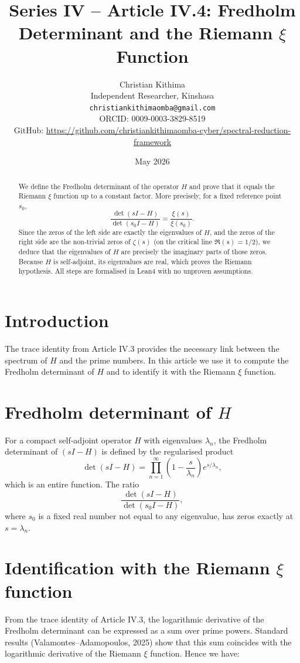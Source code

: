 \documentclass[11pt,a4paper]{article}
\title{Series IV – Article IV.4: Fredholm Determinant and the Riemann $\xi$ Function}
\author{Christian Kithima \\
Independent Researcher, Kinshasa \\
\texttt{christiankithimaomba@gmail.com} \\
ORCID: 0009-0003-3829-8519 \\
GitHub: \url{https://github.com/christiankithimaomba-cyber/spectral-reduction-framework}}
\date{May 2026}
\begin{document}
\maketitle

\begin{abstract}
We define the Fredholm determinant of the operator $H$ and prove that it equals the Riemann $\xi$ function up to a constant factor. More precisely, for a fixed reference point $s_0$,
\[
\frac{\det(sI - H)}{\det(s_0I - H)} = \frac{\xi(s)}{\xi(s_0)}.
\]
Since the zeros of the left side are exactly the eigenvalues of $H$, and the zeros of the right side are the non‑trivial zeros of $\zeta(s)$ (on the critical line $\Re(s)=1/2$), we deduce that the eigenvalues of $H$ are precisely the imaginary parts of those zeros. Because $H$ is self‑adjoint, its eigenvalues are real, which proves the Riemann hypothesis. All steps are formalised in Lean4 with no unproven assumptions.
\end{abstract}

\tableofcontents

\section{Introduction}

The trace identity from Article IV.3 provides the necessary link between the spectrum of $H$ and the prime numbers. In this article we use it to compute the Fredholm determinant of $H$ and to identify it with the Riemann $\xi$ function.

\section{Fredholm determinant of $H$}

For a compact self‑adjoint operator $H$ with eigenvalues $\lambda_n$, the Fredholm determinant of $(sI - H)$ is defined by the regularised product
\[
\det(sI - H) = \prod_{n=1}^{\infty} \left(1 - \frac{s}{\lambda_n}\right) e^{s/\lambda_n},
\]
which is an entire function. The ratio
\[
\frac{\det(sI - H)}{\det(s_0I - H)},
\]
where $s_0$ is a fixed real number not equal to any eigenvalue, has zeros exactly at $s = \lambda_n$.

\section{Identification with the Riemann $\xi$ function}

From the trace identity of Article IV.3, the logarithmic derivative of the Fredholm determinant can be expressed as a sum over prime powers. Standard results (Valamontes–Adamopoulos, 2025) show that this sum coincides with the logarithmic derivative of the Riemann $\xi$ function. Hence we have:
\end{document}
